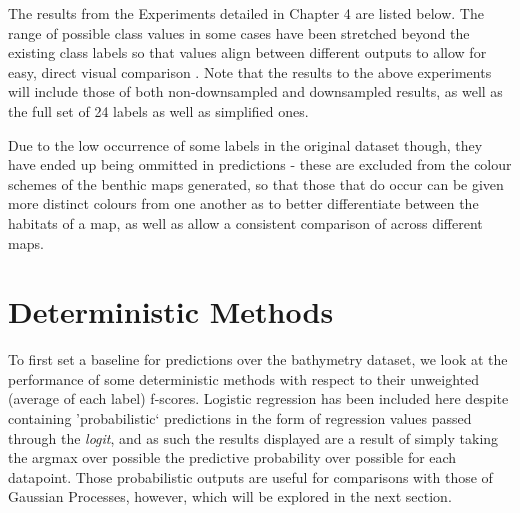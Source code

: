 The results from the Experiments detailed in Chapter 4 are listed below. The range of possible class values in some cases have been stretched beyond the existing class labels so that values align between different outputs to allow for easy, direct visual comparison . Note that the results to the above experiments will include those of both non-downsampled and downsampled results, as well as the full set of 24 labels as well as simplified ones.

Due to the low occurrence of some labels in the original dataset though, they have ended up being ommitted in predictions - these are excluded from the colour schemes of the benthic maps generated, so that those that do occur can be given more distinct colours from one another as to better differentiate between the habitats of a map, as well as allow a consistent comparison of across different maps. 


\pagebreak
\section{Deterministic Methods}

To first set a baseline for predictions over the bathymetry dataset, we look at the performance of some deterministic methods with respect to their unweighted (average of each label) f-scores. Logistic regression has been included here despite containing 'probabilistic` predictions in the form of regression values passed through the \textit{logit}, and as such the results displayed are a result of simply taking the argmax over possible the predictive probability over possible for each datapoint. Those probabilistic outputs are useful for comparisons with those of Gaussian Processes, however, which will be explored in the next section. 

